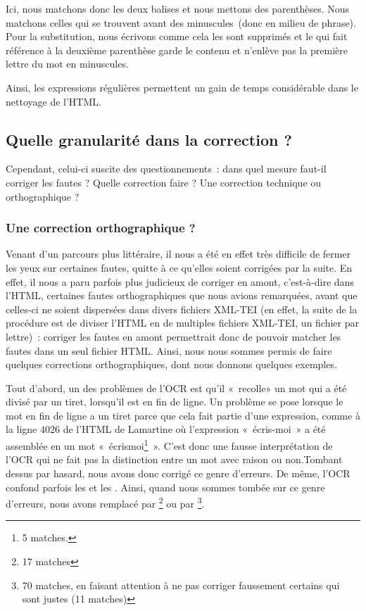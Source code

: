 Ici, nous matchons donc les deux balises  et nous mettons des parenthèses. Nous matchons celles qui se trouvent avant des minuscules (donc en milieu de phrase).
Pour la substitution, nous écrivons  comme cela les  sont supprimés et le  qui fait référence à la deuxième parenthèse garde le contenu et n’enlève pas la première lettre du mot en minuscules.

Ainsi, les expressions régulières permettent un gain de temps considérable dans le nettoyage de l'HTML.

\subsection{Quelle granularité dans la correction ?}

Cependant, celui-ci suscite des questionnements~: dans quel mesure faut-il corriger les fautes ? Quelle correction faire ? Une correction technique ou orthographique ? 

\subsubsection{Une correction orthographique ?}

Venant d'un parcours plus littéraire, il nous a été en effet très difficile de fermer les yeux sur certaines fautes, quitte à ce qu'elles soient corrigées par la suite. En effet, il nous a paru parfois plus judicieux de corriger en amont, c'est-à-dire dans l'HTML, certaines fautes orthographiques que nous avions remarquées, avant que celles-ci ne soient dispersées dans divers fichiers XML-TEI (en effet, la suite de la procédure est de diviser l'HTML en de multiples fichiers XML-TEI, un fichier par lettre)~: corriger les fautes en amont permettrait donc de pouvoir matcher les fautes dans un seul fichier HTML. Ainsi, nous nous sommes permis de faire quelques corrections orthographiques, dont nous donnons quelques exemples. 

Tout d'abord, un des problèmes de l’OCR est qu'il « recolle» un mot qui a été divisé par un tiret, lorsqu'il est en fin de ligne. 
Un problème se pose lorsque le mot en fin de ligne a un tiret parce que cela fait partie d’une expression, comme à la ligne 4026 de l'HTML de Lamartine où l’expression « écris-moi » a été assemblée en un mot « écrismoi\footnote{5 matches.} ». C'est donc une fausse interprétation de l'OCR qui ne fait pas la distinction entre un mot  avec raison ou non.Tombant dessus par hasard, nous avons donc corrigé ce genre d'erreurs. De même, l'OCR confond parfois les  et les . Ainsi, quand nous sommes tombée sur ce genre d'erreurs, nous avons remplacé  par \footnote{17 matches} ou  par \footnote{70 matches, en faisant attention à ne pas corriger faussement certains  qui sont justes (11 matches)}.

